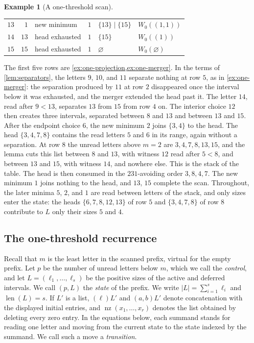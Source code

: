 \documentclass[11pt,reqno]{amsart}
\theoremstyle{definition}
\newtheorem{example}[example]{Example}
\theoremstyle{remark}
\newcommand{\nz}{\operatorname{nz}}
\begin{document}
\begin{example}[A one-threshold scan]
\begin{center}
\begin{tabular}{@{}rrlrll@{}}
$13$ & $1$ & new minimum & $1$ & $\{13\}\mid\{15\}$ & $W_{0}((1,1))$ \\
$14$ & $13$ & head exhausted & $1$ & $\{15\}$ & $W_{0}((1))$ \\
$15$ & $15$ & head exhausted & $1$ & $\varnothing$ & $W_{0}(\varnothing)$ \\
\bottomrule
\end{tabular}
\end{center}
The first five rows are \cref{ex:one-projection,ex:one-merger}.  In the
terms of \cref{lem:separators}, the letters $9$, $10$, and $11$
separate nothing at row $5$, as in \cref{ex:one-merger}: the separation
produced by $11$ at row $2$ disappeared once the interval below it was
exhausted, and the merger extended the head past it.  The letter $14$, read
after $9<13$, separates $13$ from $15$ from row $4$ on.  The interior choice $12$ then creates
three intervals, separated between $8$ and $13$ and between $13$ and $15$.
After the endpoint choice $6$, the new minimum $2$ joins $\{3,4\}$ to the head.  The
head $\{3,4,7,8\}$ contains the read letters $5$ and $6$ in its range,
again without a separation.  At row $8$ the unread letters above $m=2$ are
$3,4,7,8,13,15$, and the lemma cuts this list between $8$ and $13$, with
witness $12$ read after $5<8$, and between $13$ and $15$, with witness
$14$, and nowhere else.  This is the stack of the table.  The head is then
consumed in the $231$-avoiding order $3,8,4,7$.  The new minimum $1$ joins nothing to the head, and $13$, $15$ complete the
scan.  Throughout, the later minima $5$, $2$, and $1$ are read between
letters of the stack, and only sizes enter the state: the heads
$\{6,7,8,12,13\}$ of row $5$ and $\{3,4,7,8\}$ of row $8$ contribute to $L$
only their sizes $5$ and $4$.
\end{example}

\subsection{The one-threshold recurrence}\label{sec:one-threshold}

Recall that $m$ is the least letter in the scanned prefix, virtual for the
empty prefix.  Let $p$ be the number of unread letters below $m$, which we
call the \emph{control}, and let $L=(\ell_1,\ldots,\ell_s)$ be
the positive sizes of the active and deferred intervals.  We call $(p,L)$
the \emph{state} of the prefix.  We write
$|L|=\sum_{i=1}^s\ell_i$ and
$\operatorname{len}(L)=s$.  If $L'$ is a list, $(\ell)L'$ and
$(a,b)L'$ denote concatenation with the displayed initial entries, and
$\nz(x_1,\ldots,x_r)$ denotes the list obtained by deleting every zero
entry.  In the equations below, each summand stands for reading one letter
and moving from the current state to the state indexed by the summand.  We
call such a move a \emph{transition}.
\end{document}

